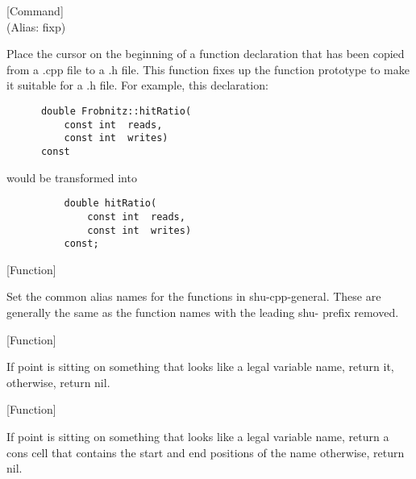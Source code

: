 \vspace{1em}
\noindent
{}
\usebox{\funcname}
 \hfill [Command]\\%
 (Alias: fixp)

\begin{doc-string}
Place the cursor on the beginning of a function declaration that has been
copied from a .cpp file to a .h file.  This function fixes up the function
prototype to make it suitable for a .h file.
For example, this declaration:

\small{\begin{verbatim}
      double Frobnitz::hitRatio(
          const int  reads,
          const int  writes)
      const
\end{verbatim}}

would be transformed into

\small{\begin{verbatim}
          double hitRatio(
              const int  reads,
              const int  writes)
          const;
\end{verbatim}}
\end{doc-string}

\vspace{1em}
\noindent
{}
\usebox{\funcname}
 \hfill [Function]

\begin{doc-string}
Set the common alias names for the functions in shu-cpp-general.
These are generally the same as the function names with the leading
shu- prefix removed.
\end{doc-string}

\vspace{1em}
\noindent
{}
\usebox{\funcname}
 \hfill [Function]

\begin{doc-string}
If point is sitting on something that looks like a legal variable name, return it,
otherwise, return nil.
\end{doc-string}

\vspace{1em}
\noindent
{}
\usebox{\funcname}
 \hfill [Function]

\begin{doc-string}
If point is sitting on something that looks like a legal variable name,
return a cons cell that contains the start and end positions of the name
otherwise, return nil.
\end{doc-string}

